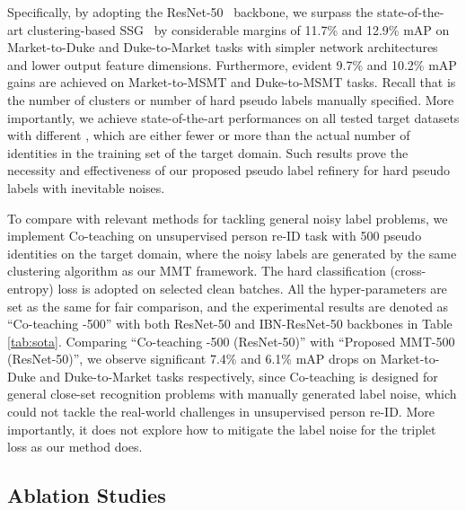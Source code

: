 \documentclass{article} \usepackage{iclr2020_conference,times}
\begin{document}
Specifically, 
by adopting the ResNet-50~\citep{he2016deep} backbone,
we surpass the state-of-the-art clustering-based SSG~\citep{yang2019selfsimilarity} by considerable margins of 11.7\% and 12.9\% mAP on Market-to-Duke and Duke-to-Market tasks with simpler network architectures and lower output feature dimensions.
Furthermore, evident 9.7\% and 10.2\% mAP gains are achieved on Market-to-MSMT and Duke-to-MSMT tasks. Recall that  is the number of clusters or number of hard pseudo labels manually specified.
More importantly,
we achieve state-of-the-art performances on all tested target datasets with different , which are either fewer or more than the actual number of identities in the training set of the target domain. Such results prove the necessity and effectiveness of our proposed pseudo label refinery for hard pseudo labels with inevitable noises.

To compare with relevant methods for tackling general noisy label problems,
we implement Co-teaching \citep{han2018co} on unsupervised person re-ID task with 500 pseudo identities on the target domain, where the noisy labels are generated by the same clustering algorithm as our MMT framework.
The hard classification (cross-entropy) loss is adopted on selected clean batches.
All the hyper-parameters are set as the same for fair comparison, and the experimental results are denoted as ``Co-teaching \citep{han2018co}-500'' with both ResNet-50 and IBN-ResNet-50 backbones in Table \ref{tab:sota}.
Comparing ``Co-teaching \citep{han2018co}-500 (ResNet-50)'' with ``Proposed MMT-500 (ResNet-50)'', we observe significant 7.4\% and 6.1\% mAP drops on Market-to-Duke and Duke-to-Market tasks respectively,
since Co-teaching \citep{han2018co} is designed for general close-set recognition problems with manually generated label noise, which could not tackle the real-world challenges in unsupervised person re-ID.
More importantly, it does not explore how to mitigate the label noise for the triplet loss as our method does.





\subsection{Ablation Studies}
\label{sec:abla}
\vspace{-5pt}
\end{document}
